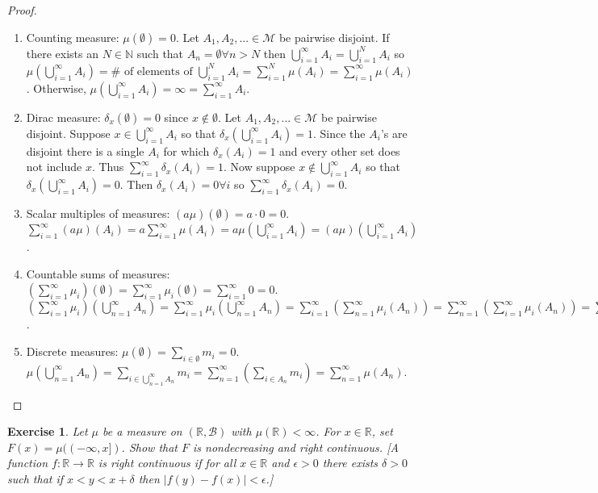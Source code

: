 \documentclass{article}
\newtheorem{exercise}[theorem]{Exercise}
\begin{document}
\begin{proof}
\begin{enumerate}
    \item Counting measure: $\mu(\emptyset)=0$. Let $A_1,A_2,...\in\mathcal{M}$ be pairwise disjoint. If there exists an $N\in\mathbb{N}$ such that $A_n=\emptyset\forall n>N$ then $\bigcup_{i=1}^\infty A_i=\bigcup_{i=1}^N A_i$ so $\mu(\bigcup_{i=1}^\infty A_i)=\#\text{ of elements of }\bigcup_{i=1}^N A_i=\sum_{i=1}^N\mu(A_i)=\sum_{i=1}^\infty\mu(A_i)$. Otherwise, $\mu(\bigcup_{i=1}^\infty A_i)=\infty=\sum_{i=1}^\infty A_i$.
    \item Dirac measure: $\delta_x(\emptyset)=0$ since $x\not\in\emptyset$. Let $A_1,A_2,...\in\mathcal{M}$ be pairwise disjoint. Suppose $x\in\bigcup_{i=1}^\infty A_i$ so that $\delta_x(\bigcup_{i=1}^\infty A_i)=1$. Since the $A_i$'s are disjoint there is a single $A_i$ for which $\delta_x(A_i)=1$ and every other set does not include $x$. Thus $\sum_{i=1}^\infty \delta_x(A_i)=1$. Now suppose $x\not\in\bigcup_{i=1}^\infty A_i$ so that $\delta_x(\bigcup_{i=1}^\infty A_i)=0$. Then $\delta_x(A_i)=0\forall i$ so $\sum_{i=1}^\infty\delta_x(A_i)=0$.
    \item Scalar multiples of measures: $(a\mu)(\emptyset)=a\cdot 0=0$. $\sum_{i=1}^\infty(a\mu)(A_i)=a\sum_{i=1}^\infty\mu(A_i)=a\mu(\bigcup_{i=1}^\infty A_i)=(a\mu)(\bigcup_{i=1}^\infty A_i)$.
    \item Countable sums of measures: $(\sum_{i=1}^\infty\mu_i)(\emptyset)=\sum_{i=1}^\infty\mu_i(\emptyset)=\sum_{i=1}^\infty 0 = 0$. $(\sum_{i=1}^\infty\mu_i)(\bigcup_{n=1}^\infty A_n)=\sum_{i=1}^\infty \mu_i(\bigcup_{n=1}^\infty A_n)=\sum_{i=1}^\infty(\sum_{n=1}^\infty \mu_i(A_n))=\sum_{n=1}^\infty(\sum_{i=1}^\infty \mu_i(A_n))=\sum_{n=1}^\infty(\sum_{i=1}^\infty\mu_i)(A_n)$.
    \item Discrete measures: $\mu(\emptyset)=\sum_{i\in\emptyset}m_i=0$. $\mu(\bigcup_{n=1}^\infty A_n)=\sum_{i\in\bigcup_{n=1}^\infty A_n}m_i=\sum_{n=1}^\infty(\sum_{i\in A_n}m_i)=\sum_{n=1}^\infty\mu(A_n)$.
\end{enumerate}
\end{proof}
\begin{exercise}
    Let $\mu$ be a measure on $(\mathbb{R}, \mathcal{B})$ with $\mu(\mathbb{R}) < \infty$. For $x \in \mathbb{R}$, set $F(x) = \mu((-\infty, x])$. Show that $F$ is nondecreasing and right continuous. [A function $f : \mathbb{R} \to \mathbb{R}$ is right continuous if for all $x \in \mathbb{R}$ and $\epsilon > 0$ there exists $\delta > 0$ such that if $x < y < x + \delta$ then $|f(y) - f(x)| < \epsilon$.]
\end{exercise}
\end{document}
